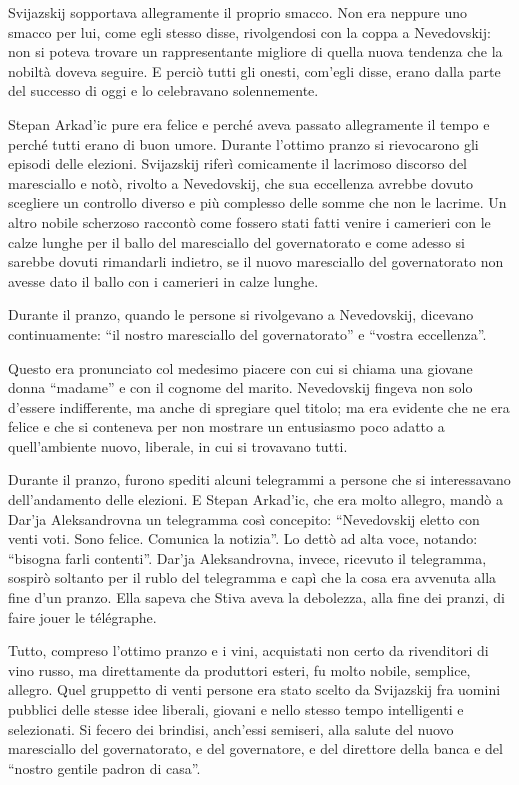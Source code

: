 Svijazskij sopportava allegramente il proprio smacco. Non era neppure uno smacco per lui, come egli stesso disse, rivolgendosi con la coppa a Nevedovskij: non si poteva trovare un rappresentante migliore di quella nuova tendenza che la nobiltà doveva seguire. E perciò tutti gli onesti, com'egli disse, erano dalla parte del successo di oggi e lo celebravano solennemente. 

Stepan Arkad'ic pure era felice e perché aveva passato allegramente il tempo e perché tutti erano di buon umore. Durante l'ottimo pranzo si rievocarono gli episodi delle elezioni. Svijazskij riferì comicamente il lacrimoso discorso del maresciallo e notò, rivolto a Nevedovskij, che sua eccellenza avrebbe dovuto scegliere un controllo diverso e più complesso delle somme che non le lacrime. Un altro nobile scherzoso raccontò come fossero stati fatti venire i camerieri con le calze lunghe per il ballo del maresciallo del governatorato e come adesso si sarebbe dovuti rimandarli indietro, se il nuovo maresciallo del governatorato non avesse dato il ballo con i camerieri in calze lunghe. 

Durante il pranzo, quando le persone si rivolgevano a Nevedovskij, dicevano continuamente: ``il nostro maresciallo del governatorato'' e ``vostra eccellenza''. 

Questo era pronunciato col medesimo piacere con cui si chiama una giovane donna ``madame'' e con il cognome del marito. Nevedovskij fingeva non solo d'essere indifferente, ma anche di spregiare quel titolo; ma era evidente che ne era felice e che si conteneva per non mostrare un entusiasmo poco adatto a quell'ambiente nuovo, liberale, in cui si trovavano tutti. 

Durante il pranzo, furono spediti alcuni telegrammi a persone che si interessavano dell'andamento delle elezioni. E Stepan Arkad'ic, che era molto allegro, mandò a Dar'ja Aleksandrovna un telegramma così concepito: ``Nevedovskij eletto con venti voti. Sono felice. Comunica la notizia''. Lo dettò ad alta voce, notando: ``bisogna farli contenti''. Dar'ja Aleksandrovna, invece, ricevuto il telegramma, sospirò soltanto per il rublo del telegramma e capì che la cosa era avvenuta alla fine d'un pranzo. Ella sapeva che Stiva aveva la debolezza, alla fine dei pranzi, di faire jouer le télégraphe. 

Tutto, compreso l'ottimo pranzo e i vini, acquistati non certo da rivenditori di vino russo, ma direttamente da produttori esteri, fu molto nobile, semplice, allegro. Quel gruppetto di venti persone era stato scelto da Svijazskij fra uomini pubblici delle stesse idee liberali, giovani e nello stesso tempo intelligenti e selezionati. Si fecero dei brindisi, anch'essi semiseri, alla salute del nuovo maresciallo del governatorato, e del governatore, e del direttore della banca e del ``nostro gentile padron di casa''. 

